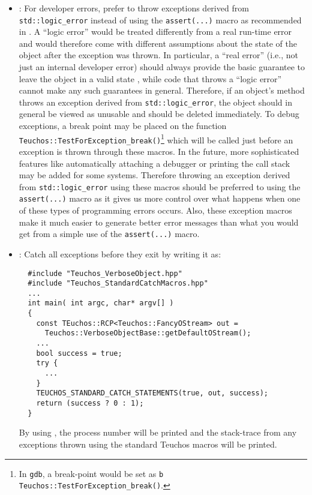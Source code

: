 \begin{itemize}

\item\GCGTestForException: For developer errors, prefer to throw
  exceptions derived from {}\texttt{std\-::logic\-\_error} instead of
  using the {}\texttt{assert(...)}  macro as recommended in
  {}\cite[Item 68]{C++CodingStandards05}.  A ``logic error'' would be
  treated differently from a real run-time error and would therefore
  come with different assumptions about the state of the object after
  the exception was thrown.  In particular, a ``real error'' (i.e.,
  not just an internal developer error) should always provide the
  basic guarantee to leave the object in a valid state \cite[Item
  71]{C++CodingStandards05}, while code that throws a ``logic error''
  cannot make any such guarantees in general.  Therefore, if an
  object's method throws an exception derived from
  \texttt{std\-::logic\-\_error}, the object should in general be
  viewed as unusable and should be deleted immediately.  To debug
  exceptions, a break point may be placed on the function
  {}\texttt{Teuchos::Test\-For\-Exception\-\_break()}\footnote{In
  {}\texttt{gdb}, a break-point would be set as {}\texttt{b
  Teuchos::Test\-For\-Exception\-\_break()}.} which will be called
  just before an exception is thrown through these macros.  In the
  future, more sophisticated features like automatically attaching a
  debugger or printing the call stack may be added for some systems.
  Therefore throwing an exception derived from
  \texttt{std\-::logic\-\_error} using these macros should be
  preferred to using the {}\texttt{assert(...)} macro as it gives us
  more control over what happens when one of these types of
  programming errors occurs.  Also, these exception macros make it
  much easier to generate better error messages than what you would
  get from a simple use of the \texttt{assert(...)} macro.

{}\item\GCGStandardCatchStatements: Catch all exceptions before they
exit {} by writing it as:

{\small\begin{verbatim}
  #include "Teuchos_VerboseObject.hpp"
  #include "Teuchos_StandardCatchMacros.hpp"
  ...
  int main( int argc, char* argv[] )
  {
    const TEuchos::RCP<Teuchos::FancyOStream> out =
      Teuchos::VerboseObjectBase::getDefaultOStream();
    ...
    bool success = true;
    try {
      ...
    } 
    TEUCHOS_STANDARD_CATCH_STATEMENTS(true, out, success);
    return (success ? 0 : 1);
  }
\end{verbatim}}

By using {}, the
process number will be printed and the stack-trace from any exceptions
thrown using the standard Teuchos macros will be printed.

\end{itemize}


